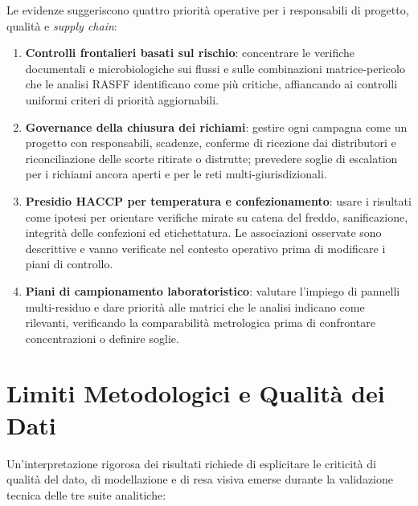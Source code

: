 Le evidenze suggeriscono quattro priorità operative per i responsabili di progetto, qualità e \textit{supply chain}:

\begin{enumerate}
    \item \textbf{Controlli frontalieri basati sul rischio}: concentrare le verifiche documentali e microbiologiche sui flussi e sulle combinazioni matrice-pericolo che le analisi RASFF identificano come più critiche, affiancando ai controlli uniformi criteri di priorità aggiornabili.

    \item \textbf{Governance della chiusura dei richiami}: gestire ogni campagna come un progetto con responsabili, scadenze, conferme di ricezione dai distributori e riconciliazione delle scorte ritirate o distrutte; prevedere soglie di escalation per i richiami ancora aperti e per le reti multi-giurisdizionali.

    \item \textbf{Presidio HACCP per temperatura e confezionamento}: usare i risultati come ipotesi per orientare verifiche mirate su catena del freddo, sanificazione, integrità delle confezioni ed etichettatura. Le associazioni osservate sono descrittive e vanno verificate nel contesto operativo prima di modificare i piani di controllo.

    \item \textbf{Piani di campionamento laboratoristico}: valutare l'impiego di pannelli multi-residuo e dare priorità alle matrici che le analisi indicano come rilevanti, verificando la comparabilità metrologica prima di confrontare concentrazioni o definire soglie.
\end{enumerate}

\section{Limiti Metodologici e Qualità dei Dati}
\label{sec:disc_limits}

Un'interpretazione rigorosa dei risultati richiede di esplicitare le criticità di qualità del dato, di modellazione e di resa visiva emerse durante la validazione tecnica delle tre suite analitiche:

